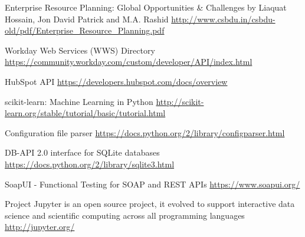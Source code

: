 \begin{thebibliography}{9}
	
	
	Enterprise Resource Planning: Global Opportunities \& Challenges
	by Liaquat Hossain, Jon David Patrick and M.A. Rashid 
	\url{http://www.csbdu.in/csbdu-old/pdf/Enterprise_Resource_Planning.pdf}
	 
	Workday Web Services (WWS) Directory
	\url{https://community.workday.com/custom/developer/API/index.html}
	
	HubSpot API
	\url{https://developers.hubspot.com/docs/overview}
	
	scikit-learn: Machine Learning in Python
	\url{http://scikit-learn.org/stable/tutorial/basic/tutorial.html}
	 
	Configuration file parser
	\url{https://docs.python.org/2/library/configparser.html}
	 
	
	DB-API 2.0 interface for SQLite databases
	\url{https://docs.python.org/2/library/sqlite3.html}
	
	SoapUI - Functional Testing for SOAP and REST APIs
	\url{https://www.soapui.org/}

	
		
	Project Jupyter is an open source project, it evolved to support interactive data science and scientific computing across all programming languages
	\url{http://jupyter.org/}
	
	
	
\end{thebibliography}